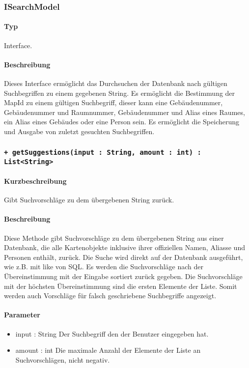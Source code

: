 \subsubsection{ISearchModel}
\paragraph*{Typ}
Interface.
\paragraph*{Beschreibung}
Dieses Interface ermöglicht das Durchsuchen der Datenbank nach gültigen Suchbegriffen zu einem gegebenen String.
Es ermöglicht die Bestimmung der MapId zu einem gültigen Suchbegriff, 
dieser kann eine Gebäudenummer, Gebäudenummer und Raumnummer, Gebäudenummer und Alias eines Raumes, ein Alias eines Gebäudes oder eine Person sein.
Es ermöglicht die Speicherung und Ausgabe von zuletzt gesuchten Suchbegriffen.

 \subsubsection*{\texttt{+ getSuggestions(input : String, amount : int) : List<String>}}%
\paragraph*{Kurzbeschreibung}
Gibt Suchvorschläge zu dem übergebenen String zurück.
\paragraph*{Beschreibung}
Diese Methode gibt Suchvorschläge zu dem übergebenen String aus einer Datenbank, 
die alle Kartenobjekte inklusive ihrer offiziellen Namen, Aliasse und Personen enthält, zurück.
Die Suche wird direkt auf der Datenbank ausgeführt, wie z.B. mit \dq like \dq{} von SQL.
Es werden die Suchvorschläge nach der Übereinstimmung mit der Eingabe sortiert zurück gegeben.
Die Suchvorschläge mit der höchsten Übereinstimmung sind die ersten Elemente der Liste.
Somit werden auch Vorschläge für falsch geschriebene Suchbegriffe angezeigt.
\paragraph*{Parameter}
\begin{itemize}
    \item input : String Der Suchbegriff den der Benutzer eingegeben hat.
    \item amount : int Die maximale Anzahl der Elemente der Liste an Suchvorschlägen, nicht negativ.
\end{itemize}
